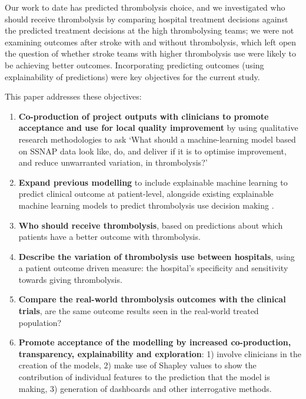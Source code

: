 
Our work to date has predicted thrombolysis choice, and we investigated who should receive thrombolysis by comparing hospital treatment decisions against the predicted treatment decisions at the high thrombolysing teams; we were not examining outcomes after stroke with and without thrombolysis, which left open the question of whether stroke teams with higher thrombolysis use were likely to be achieving better outcomes. Incorporating predicting outcomes (using explainability of predictions) were key objectives for the current study.

This paper addresses these objectives:

\begin{enumerate}

    \item \textbf{Co-production of project outputs with clinicians to promote acceptance and use for local quality improvement} by using qualitative research methodologies to ask `What should a machine-learning model based on SSNAP data look like, do, and deliver if it is to optimise improvement, and reduce unwarranted variation, in thrombolysis?'

    \item \textbf{Expand previous modelling} to include explainable machine learning to predict clinical outcome at patient-level, alongside existing explainable machine learning models to predict thrombolysis use decision making \cite{pearn_what_2023}. 

    \item \textbf{Who should receive thrombolysis}, based on predictions about which patients have a better outcome with thrombolysis.

    \item \textbf{Describe the variation of thrombolysis use between hospitals}, using a patient outcome driven measure: the hospital's specificity and sensitivity towards giving thrombolysis.

    \item \textbf{Compare the real-world thrombolysis outcomes with the clinical trials}, are the same outcome results seen in the real-world treated population?

    \item \textbf{Promote acceptance of the modelling by increased co-production, transparency, explainability and exploration}: 1) involve clinicians in the creation of the models, 2) make use of Shapley values to show the contribution of individual features to the prediction that the model is making, 3) generation of dashboards and other interrogative methods.
    
\end{enumerate}